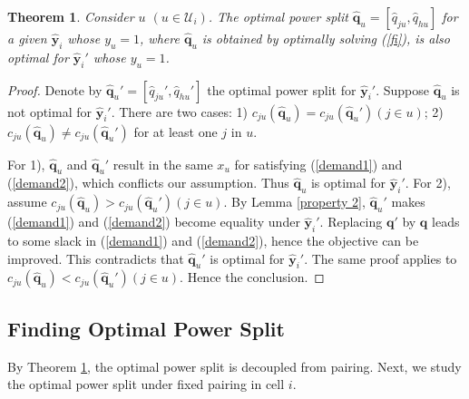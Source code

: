 \documentclass[10pt,journal,final,finalsubmission,twocolumn]{IEEEtran}
\newtheorem{theorem}{Theorem}
\begin{document}
\begin{theorem}\label{decouple}
Consider $u$ $(u\in \mathcal{U}_i)$. The optimal power split $\hat{\boldsymbol{q}}_u = [\hat{q}_{ju},\hat{q}_{hu}]$ for a given $\hat{\boldsymbol{y}}_i$ whose $y_u=1$, where $\hat{\boldsymbol{q}}_u$ is obtained by optimally solving (\ref{fi}), is also optimal for $\hat{\boldsymbol{y}}_i'$ whose $y_u=1$.
\end{theorem}
\begin{proof}
Denote by $\hat{\boldsymbol{q}}_u'=[\hat{q}_{ju}',\hat{q}_{hu}']$ the optimal power split for $\hat{\boldsymbol{y}}_i'$. Suppose $\hat{\boldsymbol{q}}_u$ is not optimal for $\hat{\boldsymbol{y}}_i'$. There are two cases: 1) $c_{ju}\left ( \hat{\boldsymbol{q}}_u \right ) = c_{ju}\left ( {\hat{\boldsymbol{q}}_u}' \right )\left (j\in u\right)$; 2) $c_{ju}\left ( {\hat{\boldsymbol{q}}_u} \right ) \neq c_{ju}\left ( {\hat{\boldsymbol{q}}_u}' \right )$ for at least one $j$ in $u$.

For 1), ${\hat{\boldsymbol{q}}_u}$ and ${\hat{\boldsymbol{q}}_u}'$ result in the same $x_u$ for satisfying (\ref{demand1}) and (\ref{demand2}), which conflicts our assumption. Thus ${\hat{\boldsymbol{q}}_u}$ is optimal for $\hat{\boldsymbol{y}}_i'$. For 2), assume $c_{ju}\left ( {\hat{\boldsymbol{q}}_u} \right ) > c_{ju}\left ( {\hat{\boldsymbol{q}}_u}' \right )\left (j\in u\right)$. By Lemma \ref{property 2}, ${\hat{\boldsymbol{q}}_u}'$ makes (\ref{demand1}) and (\ref{demand2}) become equality under $\hat{\boldsymbol{y}}_i'$. Replacing ${\boldsymbol{q}}'$ by ${\boldsymbol{q}}$ leads to some slack in (\ref{demand1}) and (\ref{demand2}), hence the objective can be improved. This contradicts that $\hat{\boldsymbol{q}}_u'$ is optimal for $\hat{\boldsymbol{y}}_i'$. The same proof applies to $c_{ju}\left ( \hat{\boldsymbol{q}}_u \right ) < c_{ju}\left (\hat{\boldsymbol{q}}_u' \right )\left (j\in u\right)$. Hence the conclusion.
\end{proof}

\subsection{Finding Optimal Power Split}\label{OptimalPowerSplit}

By Theorem \ref{decouple}, the optimal power split is decoupled from pairing. Next, we study the optimal power split under fixed pairing in cell $i$. 
\end{document}
